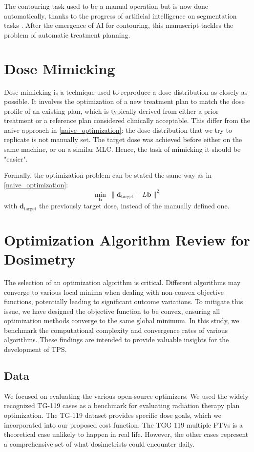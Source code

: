 The contouring task used to be a manual operation but is now done automatically, thanks to the progress of artificial intelligence on segmentation tasks \cite{Kim2024} \cite{Duan2022}.
After the emergence of AI for contouring, this manuscript tackles the problem of automatic treatment planning.

\section{Dose Mimicking}
Dose mimicking is a technique used to reproduce a dose distribution as closely as possible.
It involves the optimization of a new treatment plan to match the dose profile of an existing plan, which is typically derived from either a prior treatment or a reference plan considered clinically acceptable.
This differ from the naive approach in \ref{naive_optimization}: the dose distribution that we try to replicate is not manually set.
The target dose was achieved before either on the same machine, or on a similar MLC.
Hence, the task of mimicking it should be "easier".

Formally, the optimization problem can be stated the same way as in \ref{naive_optimization}:
$$ \min_\mathbf{b} \ \| \mathbf{d}_{\text{target}} - L\mathbf{b} \|^2 $$
with $\mathbf{d}_{\text{target}}$ the previously target dose, instead of the manually defined one.

\section{Optimization Algorithm Review for Dosimetry}
The selection of an optimization algorithm is critical.
Different algorithms may converge to various local minima when dealing with non-convex objective functions, potentially leading to significant outcome variations.
To mitigate this issue, we have designed the objective function to be convex, ensuring all optimization methods converge to the same global minimum.
In this study, we benchmark the computational complexity and convergence rates of various algorithms.
These findings are intended to provide valuable insights for the development of TPS.

\subsection{Data}
We focused on evaluating the various open-source optimizers.
We used the widely recognized TG-119 \cite{AAPM-TG119} cases as a benchmark for evaluating radiation therapy plan optimization.
The TG-119 dataset provides specific dose goals, which we incorporated into our proposed cost function.
The TGG 119 multiple PTVs is a theoretical case unlikely to happen in real life.
However, the other cases represent a comprehensive set of what dosimetrists could encounter daily.

